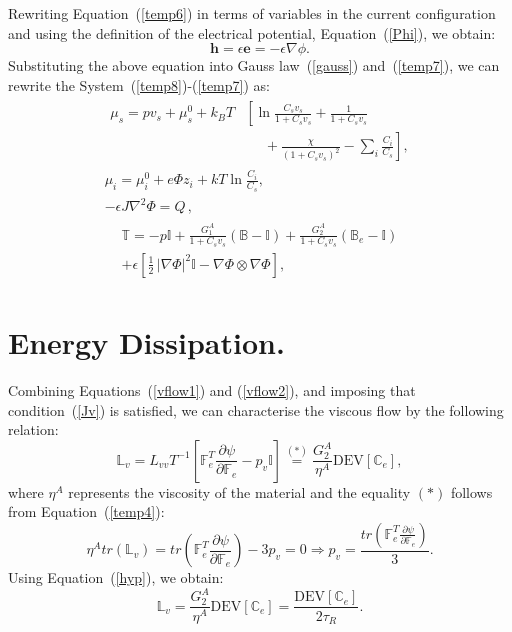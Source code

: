 \documentclass[runningheads]{llncs}
\newcommand{\F}{\ensuremath{\mathbb{F}}}
\newcommand{\LL}{\ensuremath{\mathbb{L}}}
\begin{document}
Rewriting Equation~(\ref{temp6}) in terms of variables in the current configuration and using the definition of the electrical potential, Equation~(\ref{Phi}), we obtain:
\begin{equation}
\mathbf{h}=\epsilon \mathbf{e}=-\epsilon \nabla \phi.
\end{equation}
Substituting the above equation into Gauss law~(\ref{gauss}) and~(\ref{temp7}), we can rewrite the System~(\ref{temp8})-(\ref{temp7}) as:
\begin{gather}
\begin{aligned}
\mu_s = p v_s + \mu_s^0 + k_BT&\left[\ln \frac{C_s v_s}{1+C_s v_s} + \frac{1}{1+C_sv_s}\right.\\
&\left.\ \ \ \ \ \ +\frac{\chi}{(1+C_s v_s)^2}-\sum_i \frac{C_i}{C_s}\right], 
\end{aligned}\\[2.5mm]
\mu_i = \mu^0_i + e\Phi z_i + kT \ln \frac{C_i}{C_s},\\
-\epsilon J \nabla^2 \Phi = Q\, ,
\end{gather}
\begin{gather}
\begin{aligned}
\mathbb{T}= -p \mathbb{I}+ \frac{G^A_1}{1+C_sv_s}\left(\mathbb{B}-\mathbb{I}\right) + \frac{G^A_2}{1+C_sv_s}\left(\mathbb{B}_e-\mathbb{I}\right) \\
+\epsilon \left[\frac{1}{2} \,|\nabla \Phi|^2\mathbb{I} -\nabla \Phi \otimes \nabla \Phi\right],
\end{aligned}
\end{gather}
\section{Energy Dissipation.}
\label{apenergy}
Combining Equations~(\ref{vflow1}) and (\ref{vflow2}), and imposing that condition~(\ref{Jv}) is satisfied, we can characterise the viscous flow by the following relation:
\begin{equation}
\LL_v = L_{vv}T^{-1}\left[\F_e^T\frac{\partial \psi}{\partial \F_e}-p_v\mathbb{I}\right] \stackrel{(\ast)}{=} \frac{G^A_2}{\eta^A}\text{DEV}\left[\mathbb{C}_e\right] ,\label{Lv1}
\end{equation}
where $\eta^A$ represents the viscosity of the material and the equality $(\ast)$ follows from Equation~(\ref{temp4}):
\begin{equation}
\eta^A tr(\LL_v)= tr\left(\F_e^T\frac{\partial \psi}{\partial \F_e}\right) -  3 p_v=0 \Longrightarrow  p_v = \frac{tr\left(\F_e^T\frac{\partial \psi}{\partial \F_e}\right)}{3}.
\end{equation}
Using Equation~(\ref{hyp}), we obtain:
\begin{equation}
\LL_v = \frac{G^A_2 }{\eta^A}\text{DEV}[\mathbb{C}_e] = \frac{\text{DEV}[\mathbb{C}_e]}{2\tau_R}.\label{apBe}
\end{equation}
\end{document}
